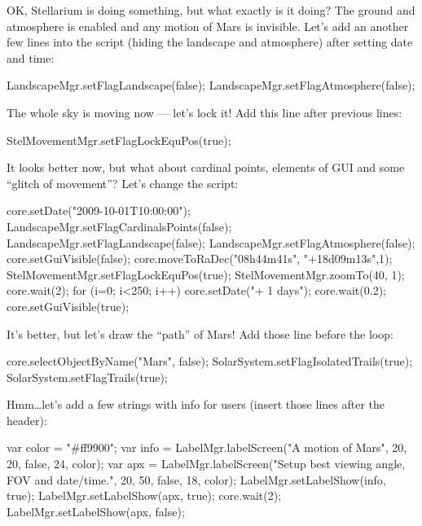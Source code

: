 OK, Stellarium is doing something, but what exactly is it
doing? The ground and atmosphere is enabled and any 
motion of Mars is invisible. Let's add an another few 
lines into the script (hiding the landscape and atmosphere) 
after setting date and time:

\begin{script}
LandscapeMgr.setFlagLandscape(false);
LandscapeMgr.setFlagAtmosphere(false);
\end{script}

The whole sky is moving now --- let's lock it! Add this line 
after previous lines:
\begin{script}
StelMovementMgr.setFlagLockEquPos(true);
\end{script}

It looks better now, but what about cardinal points, 
elements of GUI and some ``glitch of movement''? 
Let's change the script:
\begin{script}
core.setDate("2009-10-01T10:00:00");
LandscapeMgr.setFlagCardinalsPoints(false);
LandscapeMgr.setFlagLandscape(false);
LandscapeMgr.setFlagAtmosphere(false);
core.setGuiVisible(false);
core.moveToRaDec("08h44m41s", "+18d09m13s",1);
StelMovementMgr.setFlagLockEquPos(true);
StelMovementMgr.zoomTo(40, 1);
core.wait(2);
for (i=0; i<250; i++)
{
      core.setDate("+ 1 days");
      core.wait(0.2);
}
core.setGuiVisible(true);
\end{script}

It's better, but let's draw the ``path'' of Mars! Add 
those line before the loop:
\begin{script}
core.selectObjectByName("Mars", false);
SolarSystem.setFlagIsolatedTrails(true);
SolarSystem.setFlagTrails(true);
\end{script}

Hmm\ldots let's add a few strings with info for users (insert 
those lines after the header):
\begin{script}
var color = "#ff9900";
var info = LabelMgr.labelScreen("A motion of Mars", 20, 20, 
           false, 24, color);
var apx = LabelMgr.labelScreen("Setup best viewing angle, FOV 
          and date/time.", 20, 50, false, 18, color);
LabelMgr.setLabelShow(info, true);
LabelMgr.setLabelShow(apx, true);
core.wait(2);
LabelMgr.setLabelShow(apx, false);
\end{script}

